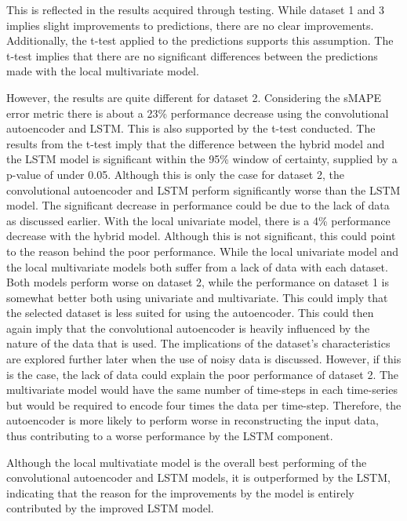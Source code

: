 This is reflected in the results acquired through testing.
While dataset 1 and 3 implies slight improvements to predictions, there are no clear improvements.
Additionally, the t-test applied to the predictions supports this assumption.
The t-test implies that there are no significant differences between the predictions made with the local multivariate model.


However, the results are quite different for dataset 2.
Considering the sMAPE error metric there is about a 23\% performance decrease using the convolutional autoencoder and LSTM.
This is also supported by the t-test conducted. The results from the t-test imply that the difference between the hybrid model and the LSTM model
is significant within the 95\% window of certainty, supplied by a p-value of under 0.05.
Although this is only the case for dataset 2, the convolutional autoencoder and LSTM perform significantly worse than the LSTM model.
The significant decrease in performance could be due to the lack of data as discussed earlier.
With the local univariate model, there is a 4\% performance decrease with the hybrid model.
Although this is not significant, this could point to the reason behind the poor performance.
While the local univariate model and the local multivariate models both suffer from a lack of data with each dataset.
Both models perform worse on dataset 2, while the performance on dataset 1 is somewhat better both using univariate and multivariate.
This could imply that the selected dataset is less suited for using the autoencoder.
This could then again imply that the convolutional autoencoder is heavily influenced by the nature of the data that is used.
The implications of the dataset's characteristics are explored further later when the use of noisy data is discussed.
However, if this is the case, the lack of data could explain the poor performance of dataset 2.
The multivariate model would have the same number of time-steps in each time-series but would be required to encode four times the data per time-step.
Therefore, the autoencoder is more likely to perform worse in reconstructing the input data,
thus contributing to a worse performance by the LSTM component.


Although the local multivatiate model is the overall best performing of the convolutional autoencoder and LSTM models,
it is outperformed by the LSTM, indicating that the reason for the improvements by the model
is entirely contributed by the improved LSTM model.





